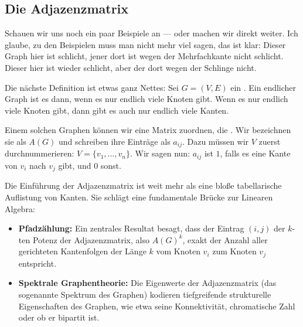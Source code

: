 \subsection{Die Adjazenzmatrix}

\begin{spoken-clean}[00:25:30 - 00:28:30]
Schauen wir uns noch ein paar Beispiele an --- oder machen wir direkt weiter. Ich glaube, zu den Beispielen muss man nicht mehr viel sagen, das ist klar: Dieser Graph hier ist schlicht, jener dort ist wegen der Mehrfachkante nicht schlicht. Dieser hier ist wieder schlicht, aber der dort wegen der Schlinge nicht.

Die nächste Definition ist etwas ganz Nettes: Sei $G = (V, E)$ ein . Ein endlicher Graph ist es dann, wenn es nur endlich viele Knoten gibt. Wenn es nur endlich viele Knoten gibt, dann gibt es auch nur endlich viele Kanten.

Einem solchen Graphen können wir eine Matrix zuordnen, die . Wir bezeichnen sie als $A(G)$ und schreiben ihre Einträge als $a_{ij}$. Dazu müssen wir $V$ zuerst durchnummerieren: $V = \{v_1, \dots, v_n\}$. Wir sagen nun: $a_{ij}$ ist $1$, falls es eine Kante von $v_i$ nach $v_j$ gibt, und $0$ sonst.
\end{spoken-clean}

\begin{didactic-insight}
Die Einführung der Adjazenzmatrix ist weit mehr als eine bloße tabellarische Auflistung von Kanten. Sie schlägt eine fundamentale Brücke zur Linearen Algebra:
\begin{itemize}
    \item \textbf{Pfadzählung:} Ein zentrales Resultat besagt, dass der Eintrag $(i,j)$ der $k$-ten Potenz der Adjazenzmatrix, also $A(G)^k$, exakt der Anzahl aller gerichteten Kantenfolgen der Länge $k$ vom Knoten $v_i$ zum Knoten $v_j$ entspricht.
    \item \textbf{Spektrale Graphentheorie:} Die Eigenwerte der Adjazenzmatrix (das sogenannte Spektrum des Graphen) kodieren tiefgreifende strukturelle Eigenschaften des Graphen, wie etwa seine Konnektivität, chromatische Zahl oder ob er bipartit ist.
\end{itemize}
\end{didactic-insight}

